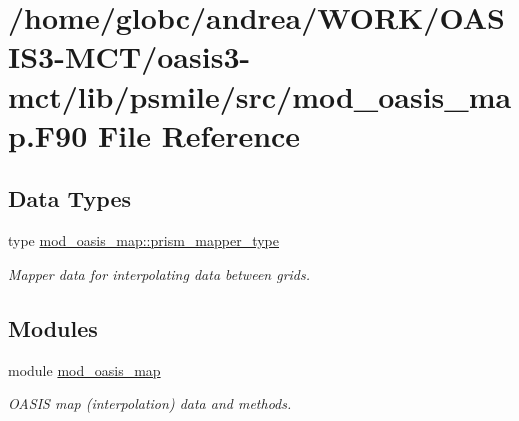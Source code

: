 \hypertarget{mod__oasis__map_8_f90}{}\section{/home/globc/andrea/\+W\+O\+R\+K/\+O\+A\+S\+I\+S3-\/\+M\+C\+T/oasis3-\/mct/lib/psmile/src/mod\+\_\+oasis\+\_\+map.F90 File Reference}
\label{mod__oasis__map_8_f90}
\subsection*{Data Types}
\begin{DoxyCompactItemize}
\item 
type \hyperlink{structmod__oasis__map_1_1prism__mapper__type}{mod\+\_\+oasis\+\_\+map\+::prism\+\_\+mapper\+\_\+type}
\begin{DoxyCompactList}\small\item\em Mapper data for interpolating data between grids. \end{DoxyCompactList}\end{DoxyCompactItemize}
\subsection*{Modules}
\begin{DoxyCompactItemize}
\item 
module \hyperlink{namespacemod__oasis__map}{mod\+\_\+oasis\+\_\+map}
\begin{DoxyCompactList}\small\item\em O\+A\+S\+IS map (interpolation) data and methods. \end{DoxyCompactList}\end{DoxyCompactItemize}
